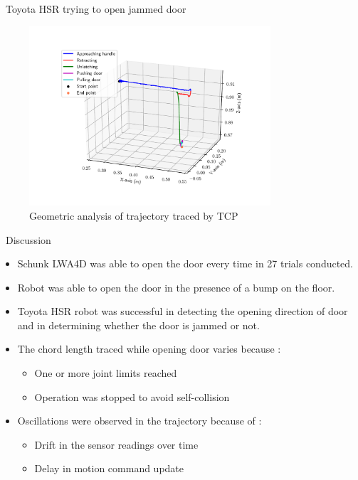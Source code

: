 \documentclass[aspectratio=43,10pt,fleqn,t]{beamer}
\begin{document}
\begin{frame}{~}{\small Toyota HSR trying to open jammed door}
	\vspace{-1cm}
	\begin{figure}[t]
		\centering
		\includegraphics[width=0.8\textwidth]{images/exp/8776_traj.pdf}
		\caption{Geometric analysis of trajectory traced by TCP}

	\end{figure}
\end{frame}


\begin{frame}{~}{Discussion}
	\begin{itemize}
		
		\item Schunk LWA4D was able to open the door every time in 27 trials conducted.
				\item Robot was able to open the door in the presence of a bump on the floor.
		\item Toyota HSR robot was successful in detecting the opening direction of door and in determining whether the door is jammed or not.
		
		\item The chord length traced while opening door varies because :
		\begin{itemize}
			\item One or more joint limits reached
			\item Operation was stopped to avoid self-collision
		\end{itemize}
		\item Oscillations were observed in the trajectory because of :
		\begin{itemize}
			\item Drift in the sensor readings over time
			\item Delay in motion command update
		\end{itemize}

	\end{itemize}
\end{frame}
\end{document}
